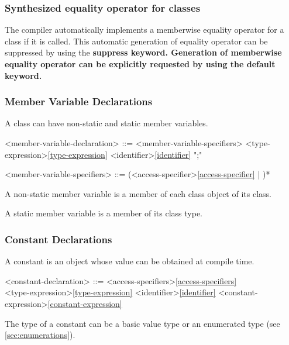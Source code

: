 \documentclass[a4paper,oneside,11pt]{article}
\begin{document}
\subsubsection{Synthesized equality operator for classes}\label{sec:synthesizedeq}

The compiler automatically implements a memberwise equality operator for a class if it is called.
This automatic generation of equality operator can be suppressed by using the \bf{suppress} keyword.
Generation of memberwise equality operator can be explicitly requested by using the \bf{default} keyword.


\subsubsection{Member Variable Declarations}

A class can have non-static and static member variables.

\begin{grammar}
\label{member-variable-declaration}<member-variable-declaration> ::= <member-variable-specifiers> <type-expression>\ref{type-expression} <identifier>\ref{identifier} ";"

<member-variable-specifiers> ::= (<access-specifier>\ref{access-specifier} | )*
\end{grammar}

A non-static member variable is a member of each class object of its class.

A static member variable is a member of its class type.

\subsubsection{Constant Declarations}

A constant is an object whose value can be obtained at compile time.

\begin{grammar}
\label{constant-declaration}<constant-declaration> ::= <access-specifiers>\ref{access-specifiers}\\
 <type-expression>\ref{type-expression} <identifier>\ref{identifier} \lit*{=} <constant-expression>\ref{constant-expression} \lit*{;}

\end{grammar}

The type of a constant can be a basic value type or an enumerated type (see \ref{sec:enumerations}).
\end{document}
